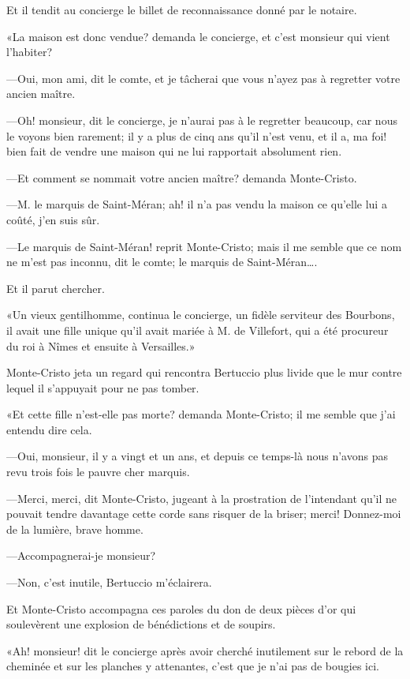 Et il tendit au concierge le billet de reconnaissance donné par le notaire.  

«La maison est donc vendue? demanda le concierge, et c'est monsieur qui vient l'habiter? 

—Oui, mon ami, dit le comte, et je tâcherai que vous n'ayez pas à regretter votre ancien maître. 

—Oh! monsieur, dit le concierge, je n'aurai pas à le regretter beaucoup, car nous le voyons bien rarement; il y a plus de cinq ans qu'il n'est venu, et il a, ma foi! bien fait de vendre une maison qui ne lui rapportait absolument rien. 

—Et comment se nommait votre ancien maître? demanda Monte-Cristo. 

—M. le marquis de Saint-Méran; ah! il n'a pas vendu la maison ce qu'elle lui a coûté, j'en suis sûr. 

—Le marquis de Saint-Méran! reprit Monte-Cristo; mais il me semble que ce nom ne m'est pas inconnu, dit le comte; le marquis de Saint-Méran\dots. 

Et il parut chercher. 

«Un vieux gentilhomme, continua le concierge, un fidèle serviteur des Bourbons, il avait une fille unique qu'il avait mariée à M. de Villefort, qui a été procureur du roi à Nîmes et ensuite à Versailles.» 

Monte-Cristo jeta un regard qui rencontra Bertuccio plus livide que le mur contre lequel il s'appuyait pour ne pas tomber. 

«Et cette fille n'est-elle pas morte? demanda Monte-Cristo; il me semble que j'ai entendu dire cela. 

—Oui, monsieur, il y a vingt et un ans, et depuis ce temps-là nous n'avons pas revu trois fois le pauvre cher marquis. 

—Merci, merci, dit Monte-Cristo, jugeant à la prostration de l'intendant qu'il ne pouvait tendre davantage cette corde sans risquer de la briser; merci! Donnez-moi de la lumière, brave homme. 

—Accompagnerai-je monsieur?  

—Non, c'est inutile, Bertuccio m'éclairera. 

Et Monte-Cristo accompagna ces paroles du don de deux pièces d'or qui soulevèrent une explosion de bénédictions et de soupirs. 

«Ah! monsieur! dit le concierge après avoir cherché inutilement sur le rebord de la cheminée et sur les planches y attenantes, c'est que je n'ai pas de bougies ici. 

